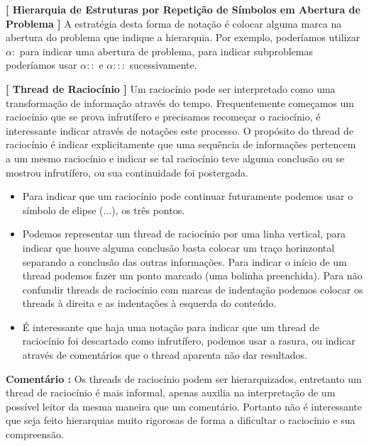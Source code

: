 \documentclass[10pt,a4paper]{report}
\begin{document}
\hspace{\baselineskip}

\textbf{[ Hierarquia de Estruturas por Repetição de Símbolos em Abertura de Problema ]} A estratégia desta forma de notação é colocar alguma marca na abertura do problema que indique a hierarquia. Por exemplo, poderíamos utilizar $\alpha :$ para indicar uma abertura de problema, para indicar subproblemas poderíamos usar $\alpha::$ e $\alpha :::$ sucessivamente.

\hspace{\baselineskip}

\textbf{[ Thread de Raciocínio ]} Um raciocínio pode ser interpretado como uma transformação de informação através do tempo. Frequentemente começamos um raciocínio que se prova infrutífero e precisamos recomeçar o raciocínio, é interessante indicar através de notações este processo. O propósito do thread de raciocínio é indicar explicitamente que uma sequência de informações pertencem a um mesmo raciocínio e indicar se tal raciocínio teve alguma conclusão ou se mostrou infrutífero, ou sua continuidade foi postergada.

\begin{itemize}
	\item[ (i) ] Para indicar que um raciocínio pode continuar futuramente podemos usar o símbolo de elipse (...), os três pontos.
	\item[ (ii) ] Podemos representar um thread de raciocínio por uma linha vertical, para indicar que houve alguma conclusão basta colocar um traço horinzontal separando a conclusão das outras informações. Para indicar o início de um thread podemos fazer um ponto marcado (uma bolinha preenchida). Para não confundir threads de raciocínio com marcas de indentação podemos colocar os threads à direita e as indentações à esquerda do conteúdo.
	\item[ (iii) ] É interessante que haja uma notação para indicar que um thread de raciocínio foi descartado como infrutífero, podemos usar a rasura, ou indicar através de comentários que o thread aparenta não dar resultados.
\end{itemize}

\textbf{Comentário :} Os threads de raciocínio podem ser hierarquizados, entretanto um thread de raciocínio é mais informal, apenas auxilia na interpretação de um possível leitor da mesma maneira que um comentário. Portanto não é interessante que seja feito hierarquias muito rigorosas de forma a dificultar o raciocínio e sua compreensão.
\end{document}
